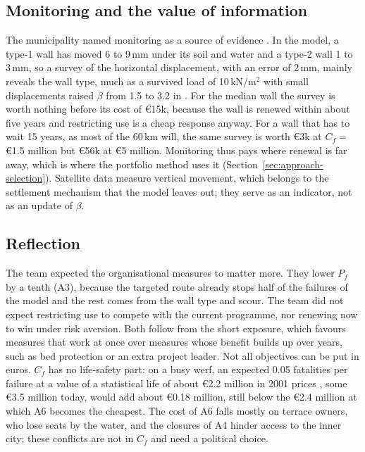 \subsection{Monitoring and the value of information}\label{sec:to-monitoring}

The municipality named monitoring as a source of evidence
\parencite{utrecht_qa2026}. In the model, a type-1 wall has moved 6 to 9\,mm under its soil and water and a type-2 wall 1 to 3\,mm, so a
survey of the horizontal displacement, with an error of 2\,mm, mainly reveals
the wall type, much as a survived load of 10\,kN/m$^2$ with small displacements
raised $\beta$ from 1.5 to 3.2 in \textcite{hemel2024}. For the median wall the survey is worth
nothing before its cost of \euro15k, because the wall is renewed within about
five years and restricting use is a cheap response anyway. For a wall that has
to wait 15 years, as most of the 60\,km will, the same survey is worth \euro3k
at $C_f = $ \euro1.5 million but \euro56k at \euro5 million. Monitoring thus pays
where renewal is far away, which is where the portfolio method uses it
(Section~\ref{sec:approach-selection}). Satellite data measure vertical
movement, which belongs to the settlement mechanism that the model leaves out;
they serve as an indicator, not as an update of $\beta$.

\subsection{Reflection}\label{sec:to-reflection}

The team expected the organisational measures to matter more. They lower $P_f$
by a tenth (A3), because the targeted route already stops half of the failures
of the model and the rest comes from the wall type and scour. The team did not expect restricting use to compete with the
current programme, nor renewing now to win under risk aversion. Both
follow from the short exposure, which favours measures that work at once over
measures whose benefit builds up over years, such as bed protection or an extra
project leader. Not all objectives can be put in euros. $C_f$ has no life-safety
part: on a busy werf, an expected 0.05 fatalities per failure at a value of a
statistical life of about \euro2.2 million in 2001 prices \parencite{deblaeij2003},
some \euro3.5 million today, would add about \euro0.18 million, still below the
\euro2.4 million at which A6 becomes the cheapest. The cost of A6
falls mostly on terrace owners, who lose seats by the water, and the closures
of A4 hinder access to the inner city; these conflicts are not in $C_f$ and need
a political choice.

